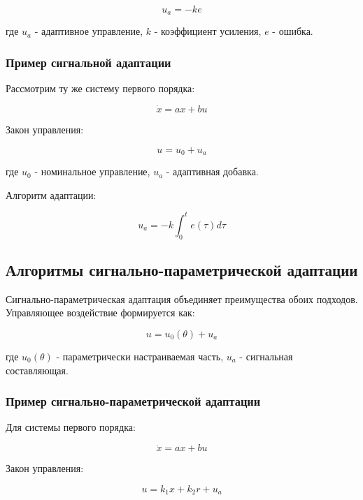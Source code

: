 \documentclass[a4paper,14pt]{extarticle} %
\begin{document}
\begin{equation}
u_{a} = -k e
\end{equation}

где $u_{a}$ - адаптивное управление, $k$ - коэффициент усиления, $e$ - ошибка.

\subsubsection{Пример сигнальной адаптации}
Рассмотрим ту же систему первого порядка:

\begin{equation}
\dot{x} = ax + bu
\end{equation}

Закон управления:

\begin{equation}
u = u_0 + u_a
\end{equation}

где $u_0$ - номинальное управление, $u_a$ - адаптивная добавка.

Алгоритм адаптации:

\begin{equation}
u_a = -k \int_0^t e(\tau) d\tau
\end{equation}

\subsection{Алгоритмы сигнально-параметрической адаптации}
Сигнально-параметрическая адаптация объединяет преимущества обоих подходов. Управляющее воздействие формируется как:

\begin{equation}
u = u_{0}(\theta) + u_{a}
\end{equation}

где $u_{0}(\theta)$ - параметрически настраиваемая часть, $u_{a}$ - сигнальная составляющая.

\subsubsection{Пример сигнально-параметрической адаптации}
Для системы первого порядка:

\begin{equation}
\dot{x} = ax + bu
\end{equation}

Закон управления:

\begin{equation}
u = k_1 x + k_2 r + u_a
\end{equation}
\end{document}
